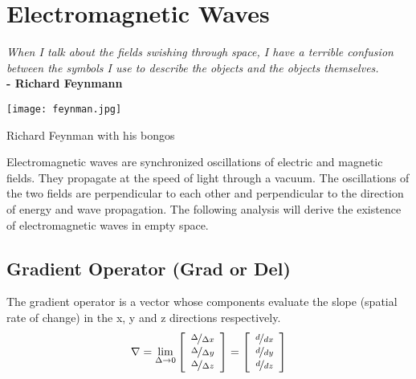 \chapter{Electromagnetic Waves}

\textit{When I talk about the fields swishing through space, I have a terrible confusion between the symbols I use to describe the objects and the objects themselves.}\\
\noindent\textbf{-   Richard Feynmann}

\vspace{1cm}

\begin{marginfigure}%
  \texttt{[image: feynman.jpg]}
  \caption{Richard Feynman with his bongos}
  \label{fig:marginfig}
\end{marginfigure}

\noindent Electromagnetic waves are synchronized oscillations of electric and magnetic fields.   They propagate at the speed of light through a vacuum.  The oscillations of the two fields are perpendicular to each other and perpendicular to the direction of energy and wave propagation.  The following analysis will derive the existence of electromagnetic waves in empty space.


\section{Gradient Operator (Grad or Del)}
The gradient operator is a vector whose components evaluate the slope (spatial rate of change) in the x, y and z directions respectively.
$$\nabla=\lim_{\Delta \rightarrow 0}\left[\begin{array}{c} \nicefrac{\Delta }{\Delta x} \\ \nicefrac{\Delta }{\Delta y} \\ \nicefrac{\Delta }{\Delta z}\end{array}\right]=\left[\begin{array}{c} \nicefrac{d }{d x} \\ \nicefrac{d }{d y} \\ \nicefrac{d}{d z}\end{array}\right]$$


